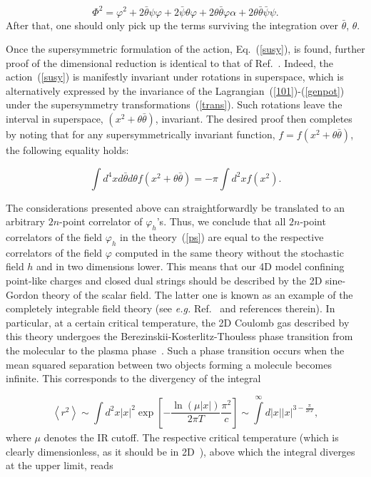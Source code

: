 \documentclass[a4paper,12pt]{article}
\begin{document}
$$\Phi^2=\varphi^2+2\bar\theta\psi\varphi+2\bar\psi\theta\varphi+2\theta\bar\theta\varphi\alpha+
2\theta\bar\theta\bar\psi\psi.$$
After that, one should only pick up the terms surviving the integration over $\bar\theta$, $\theta$. 

Once the supersymmetric formulation of the action, Eq.~(\ref{susy}), is found, further proof of the dimensional reduction 
is identical to that of Ref.~\cite{ps}. Indeed, the action~(\ref{susy}) is manifestly invariant 
under rotations in superspace, which is alternatively 
expressed by the invariance of the Lagrangian~(\ref{101})-(\ref{genpot}) under 
the supersymmetry transformations~(\ref{trans}).  
Such rotations leave the interval in superspace, $\left(x^2+\theta\bar\theta\right)$, invariant.
The desired proof then completes by noting that for any supersymmetrically invariant function,
$f=f\left(x^2+\theta\bar\theta\right)$, the following equality holds:

$$
\int d^4xd\bar\theta d\theta f\left(x^2+\theta\bar\theta\right)=-\pi\int d^2xf\left(x^2\right).$$

The considerations presented above can straightforwardly be translated to an arbitrary $2n$-point correlator 
of $\varphi_h$'s. Thus, we conclude that all $2n$-point correlators of the field $\varphi_h$ 
in the theory~(\ref{ps}) are equal to the respective correlators of the field $\varphi$ computed 
in the same theory without the stochastic field $h$ and in two dimensions lower. This means that 
our 4D model confining point-like charges and closed dual strings should be described by the 2D sine-Gordon theory
of the scalar field. The latter one is known as an example of the completely 
integrable field theory (see {\it e.g.} Ref.~\cite{tf} and references therein).
In particular, at a certain critical temperature, the 2D Coulomb gas described by this theory undergoes
the Berezinskii-Kosterlitz-Thouless phase transition from the molecular to the plasma phase~\cite{bkt}. Such a phase transition occurs
when the mean squared separation between two objects forming a molecule becomes infinite. This corresponds to the divergency 
of the integral  

$$\left<r^2\right>\sim\int d^2x |x|^2\exp\left[-\frac{\ln(\mu|x|)}{2\pi T}\frac{\pi^2}{c}\right]\sim
\int\limits_{}^{\infty} d|x||x|^{3-\frac{\pi}{2cT}},$$ 
where $\mu$ denotes the IR cutoff. The respective critical temperature (which is clearly dimensionless, as it 
should be in 2D~\cite{bkt}), above which the integral diverges at the upper limit, reads
\end{document}
